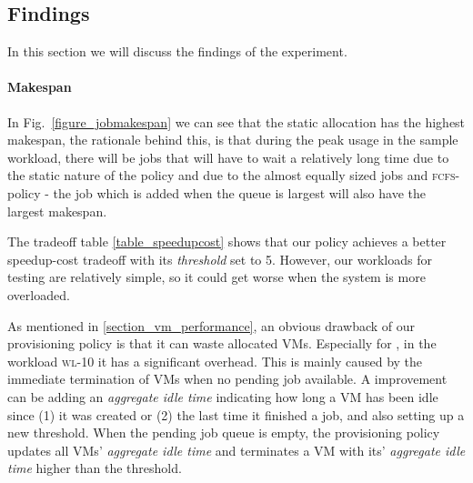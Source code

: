 

\subsection{Findings}
In this section we will discuss the findings of the experiment.

\paragraph{Makespan}
In Fig.~\ref{figure_jobmakespan} we can see that the static allocation
has the highest makespan, the rationale behind this, is that during
the peak usage in the sample workload, there will be jobs that will
have to wait a relatively long time due to the static nature of the
policy and due to the almost equally sized jobs and
\textsc{fcfs}-policy - the job which is added when the queue is largest
will also have the largest makespan.

The tradeoff table \ref{table_speedupcost} shows that our
\policysimpleelastic{} policy achieves a better speedup-cost tradeoff
with its \emph{threshold} set to 5. However, our workloads for testing
are relatively simple, so it could get worse when the system is more
overloaded.

As mentioned in \ref{section_vm_performance}, an obvious drawback of our
\policysimpleelastic{} provisioning policy is that it can waste allocated VMs.
Especially for \SEzero{}, in the workload \textsc{wl-10} it has a significant
overhead. This is mainly caused by the immediate termination of VMs when
no pending job available. A improvement can be adding an
\emph{aggregate idle time} indicating how long a VM has been idle since (1)
it was created or (2) the last time it finished a job, and also setting up
a new threshold. When the pending job queue is empty, the provisioning policy
updates all VMs' \emph{aggregate idle time} and terminates a VM with its'
\emph{aggregate idle time} higher than the threshold.

